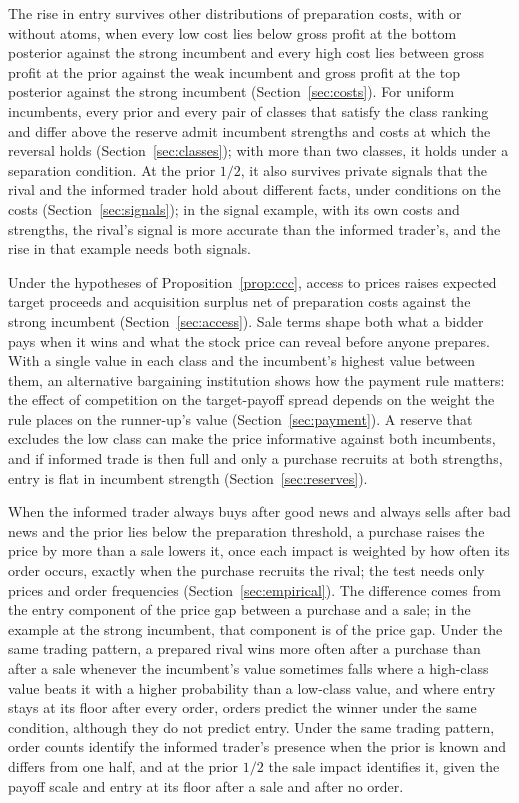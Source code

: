 The rise in entry survives other distributions of preparation costs, with or without atoms, when every low cost lies below
gross profit at the bottom posterior against the strong incumbent and every high cost lies between gross profit at
the prior against the weak incumbent and gross profit at the top posterior against the strong incumbent
(Section~\ref{sec:costs}). For uniform incumbents, every prior and every pair of classes that satisfy the class
ranking and differ above the reserve admit incumbent strengths and costs at which the reversal holds
(Section~\ref{sec:classes}); with more than two classes, it holds under a separation condition. At the prior
\(1/2\), it also survives private signals that the rival and the informed trader hold about different facts, under
conditions on the costs (Section~\ref{sec:signals}); in the signal example, with its own costs
and strengths, the rival's signal is more accurate than the informed trader's, and the rise in that example needs both
signals.

Under the hypotheses of Proposition~\ref{prop:ccc}, access to prices raises expected target proceeds and
acquisition surplus net of preparation costs against the strong incumbent (Section~\ref{sec:access}). Sale terms
shape both what a bidder pays when it wins and what
the stock price can reveal before anyone prepares. With a single value in each class and the incumbent's highest
value between them, an alternative bargaining institution shows how the payment rule matters: the effect of
competition on the target-payoff spread depends on the weight the rule places on the runner-up's value
(Section~\ref{sec:payment}). A reserve that excludes the low class can make the price informative against both
incumbents, and if informed trade is then full and only a purchase recruits at both strengths, entry is flat in
incumbent strength (Section~\ref{sec:reserves}).

When the informed trader always buys after good news and always sells after bad news and the prior lies below the
preparation threshold, a purchase raises the price by more than a sale lowers it, once each impact is weighted by how often its order
occurs, exactly when the purchase recruits the rival; the test needs only prices and order frequencies
(Section~\ref{sec:empirical}). The difference comes from the entry component of the price gap between a purchase and
a sale; in the example at the strong incumbent, that component is  of the price gap. Under the
same trading pattern, a prepared rival wins more often after a purchase than after a sale whenever the
incumbent's value sometimes falls where a high-class value beats it with a higher probability than a low-class
value, and where entry stays at its floor after every order, orders predict the winner under the same condition,
although they do not predict entry. Under the same trading pattern, order counts identify the informed trader's
presence when the prior is known and differs from one half,
and at the prior \(1/2\) the sale impact identifies it, given the payoff scale and entry at its floor after a sale
and after no order.

